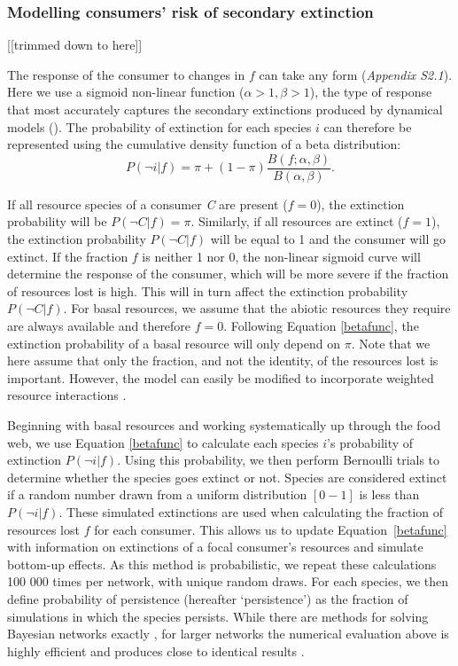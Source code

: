 \documentclass[12pt]{article}
\begin{document}
\begin{spacing}{2.0}
        \subsubsection*{Modelling consumers' risk of secondary extinction} [[trimmed down to here]]
        
        The response of the consumer to changes in $f$ can take any form (\emph{Appendix S2.1}). Here we use a sigmoid non-linear function ($\alpha > 1, \beta > 1$), the type of response that most accurately captures the secondary extinctions produced by dynamical models (\citealp[]{Eklof2013}).
		The probability of extinction for each species $i$ can therefore be represented using the cumulative density function of a beta distribution:
		\begin{equation}
		P(\lnot i|f) = \pi + (1 - \pi) \frac{B(f;\alpha,\beta)}{B(\alpha,\beta)}.
				\label{betafunc}
        \end{equation}
		
		If all resource species of a consumer \textit{C} are present ($f = 0$), the extinction probability will be $P(\lnot C|f) = \pi$. 
		Similarly, if all resources are extinct ($f = 1$), the extinction probability $P(\lnot C|f)$ will be equal to 1 and the consumer will go extinct.
		If the fraction $f$ is neither 1 nor 0, the non-linear sigmoid curve will determine the response of the consumer, which will be more severe if the fraction of resources lost is high. This will in turn affect the extinction probability $P(\lnot C|f)$.
		For basal resources, we assume that the abiotic resources they require are always available and therefore $f=0$. 
		Following Equation \ref{betafunc}, the extinction probability of a basal resource will only depend on $\pi$.
		Note that we here assume that only the fraction, and not the identity, of the resources lost is important. 
		However, the model can easily be modified to incorporate weighted resource interactions \citep[see][]{Eklof2013}.
		
		
        Beginning with basal resources and working systematically up through the food web, we use Equation \ref{betafunc} to calculate each species $i$'s probability of extinction $P(\lnot i|f)$.
        Using this probability, we then perform Bernoulli trials to determine whether the species goes extinct or not. 
        Species are considered extinct if a random number drawn from a uniform distribution $[0-1]$ is less than $P(\lnot i|f)$.
        These simulated extinctions are used when calculating the fraction of resources lost $f$ for each consumer.
        This allows us to update Equation~\ref{betafunc} with information on extinctions of a focal consumer's resources and simulate bottom-up effects. As this method is probabilistic, we repeat these calculations 100 000 times per network, with unique random draws.
        For each species, we then define probability of persistence (hereafter `persistence') as the fraction of simulations in which the species persists. 
        While there are methods for solving Bayesian networks exactly \citep{Eklof2013}, for larger networks the numerical evaluation above is highly efficient and produces close to identical results \citep{Haussler2020}.
		

\end{spacing}
\end{document}
